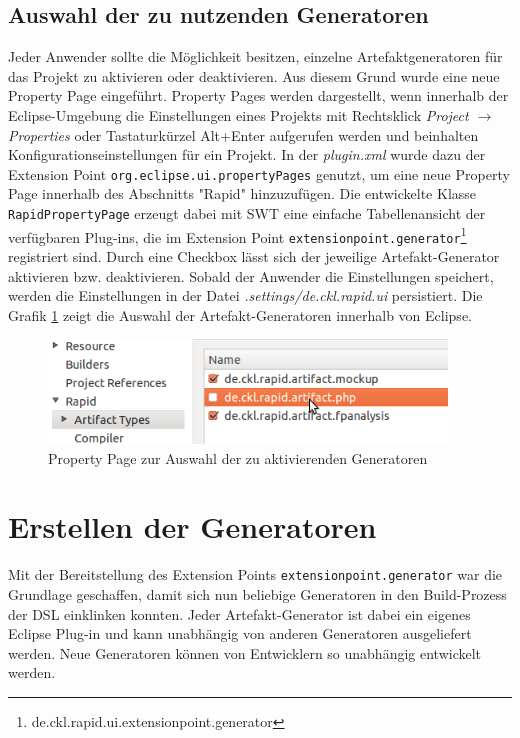 \documentclass[a4paper,12pt]{scrreprt}
\begin{document}
\subsection{Auswahl der zu nutzenden Generatoren}
Jeder Anwender sollte die Möglichkeit besitzen, einzelne Artefaktgeneratoren für das Projekt zu aktivieren oder deaktivieren. Aus diesem Grund wurde eine neue Property Page eingeführt. Property Pages werden dargestellt, wenn innerhalb der Eclipse-Umgebung die Einstellungen eines Projekts mit Rechtsklick \textit{Project $\rightarrow$ Properties} oder Tastaturkürzel Alt+Enter aufgerufen werden und beinhalten Konfigurationseinstellungen für ein Projekt.
In der \emph{plugin.xml} wurde dazu der Extension Point \verb+org.eclipse.ui.propertyPages+ genutzt, um eine neue Property Page innerhalb des Abschnitts "Rapid" hinzuzufügen. Die entwickelte Klasse \verb+RapidPropertyPage+ erzeugt dabei mit SWT eine einfache Tabellenansicht der verfügbaren Plug-ins, die im Extension Point \texttt{extensionpoint.generator}\footnote{de.ckl.rapid.ui.extensionpoint.generator} registriert sind. Durch eine Checkbox lässt sich der jeweilige Artefakt-Generator aktivieren bzw. deaktivieren. Sobald der Anwender die Einstellungen speichert, werden die Einstellungen in der Datei \emph{.settings/de.ckl.rapid.ui} persistiert. Die Grafik \ref{fig:property-page-artifact-generators} zeigt die Auswahl der Artefakt-Generatoren innerhalb von Eclipse.
\begin{figure}[h]
	\centering
		\includegraphics[width=400px]{img/property-page-artifact-generators.png}
		\caption{\label{fig:property-page-artifact-generators}Property Page zur Auswahl der zu aktivierenden Generatoren}
\end{figure}

\section{Erstellen der Generatoren}
Mit der Bereitstellung des Extension Points \texttt{extensionpoint.generator} war die Grundlage geschaffen, damit sich nun beliebige Generatoren in den Build-Prozess der DSL einklinken konnten. Jeder Artefakt-Generator ist dabei ein eigenes Eclipse Plug-in und kann unabhängig von anderen Generatoren ausgeliefert werden. Neue Generatoren können von Entwicklern so unabhängig entwickelt werden.
\end{document}
